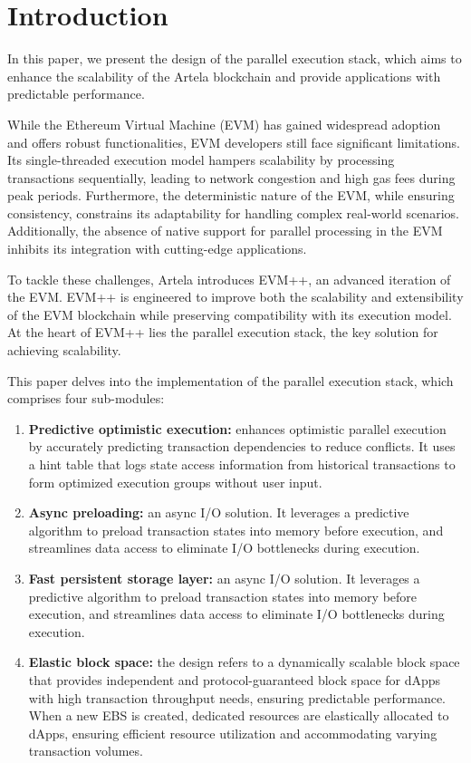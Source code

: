 
\section{Introduction}

In this paper, we present the design of the parallel execution stack, which aims to enhance the scalability of the Artela blockchain \cite{artela2023} and provide applications with predictable performance.

While the Ethereum Virtual Machine (EVM)\cite{ethereum2020evm} has gained widespread adoption and offers robust functionalities, EVM developers still face significant limitations. Its single-threaded execution model hampers scalability by processing transactions sequentially, leading to network congestion and high gas fees during peak periods. Furthermore, the deterministic nature of the EVM, while ensuring consistency, constrains its adaptability for handling complex real-world scenarios. Additionally, the absence of native support for parallel processing in the EVM inhibits its integration with cutting-edge applications.

To tackle these challenges, Artela introduces EVM++, an advanced iteration of the EVM. EVM++ is engineered to improve both the scalability and extensibility of the EVM blockchain while preserving compatibility with its execution model. At the heart of EVM++ lies the parallel execution stack, the key solution for achieving scalability.

This paper delves into the implementation of the parallel execution stack, which comprises four sub-modules:

\begin{enumerate}
  \item \textbf{Predictive optimistic execution:} enhances optimistic parallel execution by accurately predicting transaction dependencies to reduce conflicts. It uses a hint table that logs state access information from historical transactions to form optimized execution groups without user input.
  \item \textbf{Async preloading:} an async I/O solution. It leverages a predictive algorithm to preload transaction states into memory before execution, and streamlines data access to eliminate I/O bottlenecks during execution.
  \item \textbf{Fast persistent storage layer:} an async I/O solution. It leverages a predictive algorithm to preload transaction states into memory before execution, and streamlines data access to eliminate I/O bottlenecks during execution.
  \item \textbf{Elastic block space:} the design refers to a dynamically scalable block space that provides independent and protocol-guaranteed block space for dApps with high transaction throughput needs, ensuring predictable performance. When a new EBS is created, dedicated resources are elastically allocated to dApps, ensuring efficient resource utilization and accommodating varying transaction volumes.
\end{enumerate}
